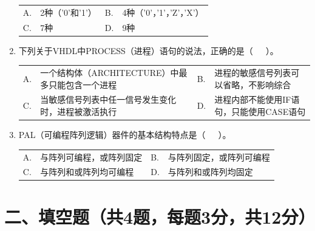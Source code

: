 \begin{enumerate}[label=\arabic*., leftmargin=*]
\vspace{0.3cm}

\begin{tabular}{@{}lp{}@{\qquad}lp{}@{}}
A. & 2种（'0'和'1'） &
B. & 4种（'0'，'1'，'Z'，'X'） \\
C. & 7种 &
D. & 9种 \\
\end{tabular}

\vspace{0.8cm}

\item 下列关于VHDL中PROCESS（进程）语句的说法，正确的是（~~~）。

\vspace{0.3cm}

\begin{tabular}{@{}lp{}@{\qquad}lp{}@{}}
A. & 一个结构体（ARCHITECTURE）中最多只能包含一个进程 &
B. & 进程的敏感信号列表可以省略，不影响综合 \\
C. & 当敏感信号列表中任一信号发生变化时，进程被激活执行 &
D. & 进程内部不能使用IF语句，只能使用CASE语句 \\
\end{tabular}

\vspace{0.8cm}

\item PAL（可编程阵列逻辑）器件的基本结构特点是（~~~）。

\vspace{0.3cm}

\begin{tabular}{@{}lp{}@{\qquad}lp{}@{}}
A. & 与阵列可编程，或阵列固定 &
B. & 与阵列固定，或阵列可编程 \\
C. & 与阵列和或阵列均可编程 &
D. & 与阵列和或阵列均固定 \\
\end{tabular}

\end{enumerate}

\section{二、填空题（共4题，每题3分，共12分）}

